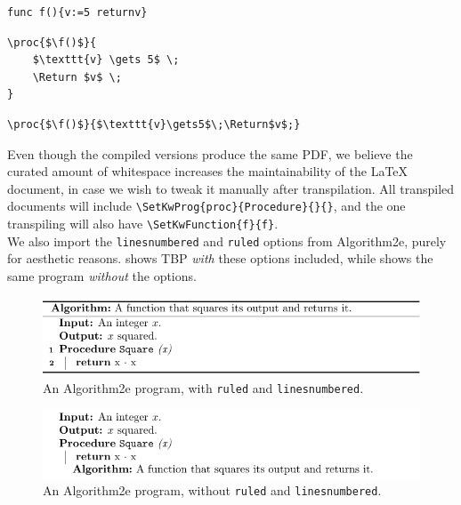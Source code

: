 \begin{lstlisting}[caption={A Gourmet function which declares a variable and returns it.}, captionpos=b, label={Gourmet f}]
func f(){v:=5 returnv}
\end{lstlisting}

\begin{lstlisting}[caption={How Psnodig transpiles the program from \Cref{Gourmet f}.}, captionpos=b, label={How Psnodig transpiles the program from}]
\proc{$\f()$}{
    $\texttt{v} \gets 5$ \;
    \Return $v$ \;
}
\end{lstlisting}

\begin{lstlisting}[caption={Alternative version of f in LaTeX with Algorithm2e.}, captionpos=b, label={Alternative version of f in LaTeX with Algorithm2e.}]
\proc{$\f()$}{$\texttt{v}\gets5$\;\Return$v$;}
\end{lstlisting}

Even though the compiled versions produce the same PDF, we believe the curated amount of whitespace increases the maintainability of the LaTeX document, in case we wish to tweak it manually after transpilation. All transpiled documents will include \texttt{\textbackslash SetKwProg\{proc\}\{Procedure\}\{\}\{\}}, and the one transpiling  will also have \texttt{\textbackslash SetKwFunction\{f\}\{f\}}. \\

We also import the \texttt{linesnumbered} and \texttt{ruled} options from Algorithm2e, purely for aesthetic reasons.  shows TBP \textit{with} these options included, while  shows the same program \textit{without} the options. \\

\begin{figure}[ht]
    \centering
    \includegraphics[scale=.95]{assets/chapter4/SquareWithOptions.pdf}
    \caption{An Algorithm2e program, with \texttt{ruled} and \texttt{linesnumbered}.}
    \label{squareWith}
\end{figure}

\begin{figure}[ht]
    \centering
    \includegraphics[scale=.95]{assets/chapter4/SquareWithoutOptions.pdf}
    \caption{An Algorithm2e program, without \texttt{ruled} and \texttt{linesnumbered}.}
    \label{squareWithout}
\end{figure}

